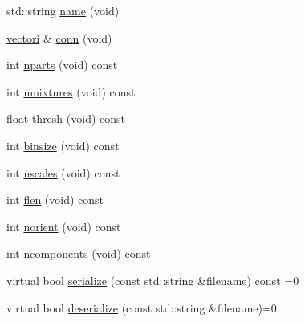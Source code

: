 \begin{DoxyCompactItemize}
\item 
std\-::string \hyperlink{classModel_aeae6527ff13db7724c53c942029d882d}{name} (void)
\item 
\hyperlink{types_8hpp_a44529587d60e73bf0e689a82e5e70a55}{vectori} \& \hyperlink{classModel_a65d5e15900bc329b42acc7ce57c45628}{conn} (void)
\item 
int \hyperlink{classModel_aadbe1db9da272e3c7925f14c10143360}{nparts} (void) const 
\item 
int \hyperlink{classModel_a86676b7fdc842393897b11ce8a7d7623}{nmixtures} (void) const 
\item 
float \hyperlink{classModel_a474739b5b87ebfc7342d10124dfd59b6}{thresh} (void) const 
\item 
int \hyperlink{classModel_a93d5e6030b6ea9ffe155b459d9e58585}{binsize} (void) const 
\item 
int \hyperlink{classModel_a3de9632d7c459c2d7ea961be84005921}{nscales} (void) const 
\item 
int \hyperlink{classModel_ad9ff4f0d1dd752dd96f6ff4a47e3486d}{flen} (void) const 
\item 
int \hyperlink{classModel_ab64488cd01aa451323bf1e30603fbc73}{norient} (void) const 
\item 
int \hyperlink{classModel_acaee5d575cfdb39a4a6ebc3b765a88bc}{ncomponents} (void) const 
\item 
virtual bool \hyperlink{classModel_a952f21d72d87aa30387ea6e5c1d603fd}{serialize} (const std\-::string \&filename) const =0
\item 
virtual bool \hyperlink{classModel_a2fc5d668c4930e8172e1a1460a8e6b46}{deserialize} (const std\-::string \&filename)=0
\end{DoxyCompactItemize}
